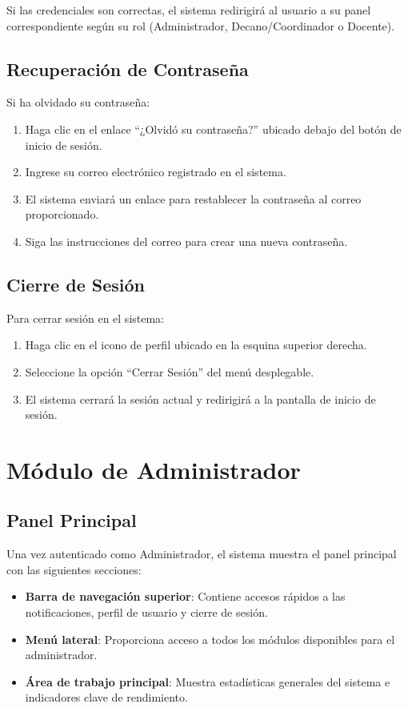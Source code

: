 \documentclass[12pt,a4paper]{book}
\begin{document}
Si las credenciales son correctas, el sistema redirigirá al usuario a su panel correspondiente según su rol (Administrador, Decano/Coordinador o Docente).

\section{Recuperación de Contraseña}
Si ha olvidado su contraseña:

\begin{enumerate}
    \item Haga clic en el enlace ``¿Olvidó su contraseña?'' ubicado debajo del botón de inicio de sesión.
    \item Ingrese su correo electrónico registrado en el sistema.
    \item El sistema enviará un enlace para restablecer la contraseña al correo proporcionado.
    \item Siga las instrucciones del correo para crear una nueva contraseña.
\end{enumerate}

\section{Cierre de Sesión}
Para cerrar sesión en el sistema:

\begin{enumerate}
    \item Haga clic en el icono de perfil ubicado en la esquina superior derecha.
    \item Seleccione la opción ``Cerrar Sesión'' del menú desplegable.
    \item El sistema cerrará la sesión actual y redirigirá a la pantalla de inicio de sesión.
\end{enumerate}

\chapter{Módulo de Administrador}
\section{Panel Principal}
Una vez autenticado como Administrador, el sistema muestra el panel principal con las siguientes secciones:

\begin{itemize}
    \item \textbf{Barra de navegación superior}: Contiene accesos rápidos a las notificaciones, perfil de usuario y cierre de sesión.
    \item \textbf{Menú lateral}: Proporciona acceso a todos los módulos disponibles para el administrador.
    \item \textbf{Área de trabajo principal}: Muestra estadísticas generales del sistema e indicadores clave de rendimiento.
\end{itemize}
\end{document}
